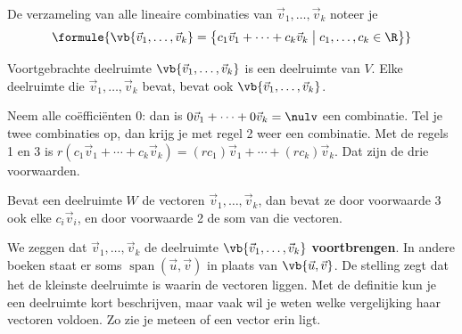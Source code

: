 \begin{theorie}
De verzameling van alle lineaire combinaties van $\vec v_1, \ldots, \vec v_k$ noteer je
\[ \formule{\vb{\vec v_1, \ldots, \vec v_k} = \bigl\{c_1\vec v_1 + \cdots + c_k\vec v_k \bigm| c_1, \ldots, c_k \in \R\bigr\}} \]

\begin{stelling}{Voortgebrachte deelruimte}
$\vb{\vec v_1, \ldots, \vec v_k}$ is een deelruimte van $V$. Elke deelruimte die $\vec v_1, \ldots, \vec v_k$ bevat, bevat ook $\vb{\vec v_1, \ldots, \vec v_k}$.
\end{stelling}

\begin{bewijs}
Neem alle coëfficiënten 0: dan is $0\vec v_1 + \cdots + 0\vec v_k = \nulv$ een combinatie. Tel je twee combinaties op, dan krijg je met regel 2
weer een combinatie. Met de regels 1 en 3 is $r(c_1\vec v_1 + \cdots + c_k\vec v_k) = (rc_1)\vec v_1 + \cdots + (rc_k)\vec v_k$. Dat zijn de drie voorwaarden.

Bevat een deelruimte $W$ de vectoren $\vec v_1, \ldots, \vec v_k$, dan bevat ze door voorwaarde 3 ook elke $c_i\vec v_i$, en door voorwaarde 2 de som van die vectoren.
\end{bewijs}
\end{theorie}

We zeggen dat $\vec v_1, \ldots, \vec v_k$ de deelruimte $\vb{\vec v_1, \ldots, \vec v_k}$ \textbf{voortbrengen}. In andere boeken staat er soms $\operatorname{span}(\vec u, \vec v)$ in plaats van $\vb{\vec u, \vec v}$. De stelling zegt dat het de kleinste deelruimte is waarin de vectoren liggen. Met de definitie kun je een deelruimte kort beschrijven, maar vaak wil je weten welke vergelijking haar vectoren voldoen. Zo zie je meteen of een vector erin ligt.



